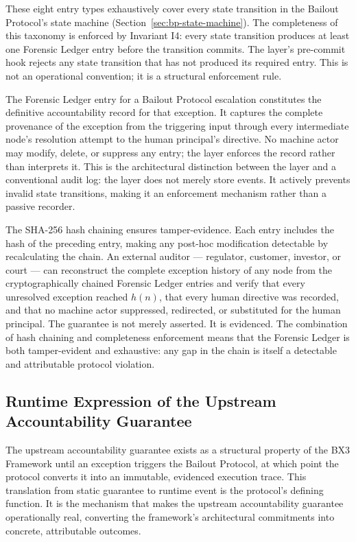 These eight entry types exhaustively cover every state transition in the
Bailout Protocol's state machine (Section~\ref{sec:bp-state-machine}).  The
completeness of this taxonomy is enforced by Invariant I4: every state
transition produces at least one Forensic Ledger entry before the transition
commits.  The \fact{} layer's pre-commit hook rejects any state transition
that has not produced its required entry.  This is not an operational
convention; it is a structural enforcement rule.

The Forensic Ledger entry for a Bailout Protocol escalation constitutes the
definitive accountability record for that exception.  It captures the complete
provenance of the exception from the triggering input through every
intermediate node's resolution attempt to the human principal's directive.
No machine actor may modify, delete, or suppress any entry; the \fact{} layer
enforces the record rather than interprets it.  This is the architectural
distinction between the \fact{} layer and a conventional audit log: the
\fact{} layer does not merely store events.  It actively prevents invalid
state transitions, making it an enforcement mechanism rather than a passive
recorder.

The SHA-256 hash chaining ensures tamper-evidence.  Each entry includes the
hash of the preceding entry, making any post-hoc modification detectable by
recalculating the chain.  An external auditor --- regulator, customer,
investor, or court --- can reconstruct the complete exception history of any
node from the cryptographically chained Forensic Ledger entries and verify
that every unresolved exception reached $h(n)$, that every human directive
was recorded, and that no machine actor suppressed, redirected, or substituted
for the human principal.  The guarantee is not merely asserted.  It is
evidenced.  The combination of hash chaining and completeness enforcement
means that the Forensic Ledger is both tamper-evident and exhaustive: any
gap in the chain is itself a detectable and attributable protocol violation.

\subsection{Runtime Expression of the Upstream Accountability Guarantee}
\label{sec:bailout-uag}

The upstream accountability guarantee exists as a structural property of the
BX3 Framework until an exception triggers the Bailout Protocol, at which
point the protocol converts it into an immutable, evidenced execution trace.
This translation from static guarantee to runtime event is the protocol's
defining function.  It is the mechanism that makes the upstream accountability
guarantee operationally real, converting the framework's architectural
commitments into concrete, attributable outcomes.


